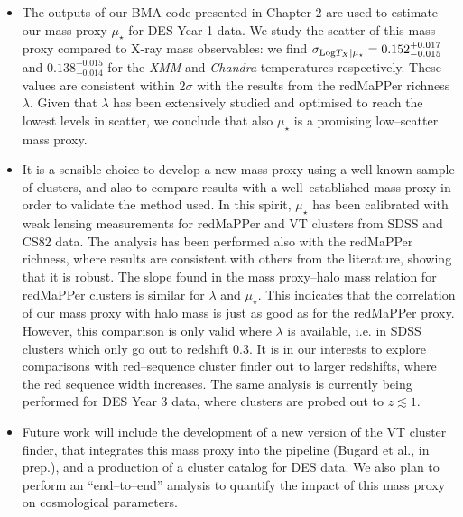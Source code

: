 \begin{itemize}
\item The outputs of our BMA code presented in Chapter 2 are used to estimate our mass proxy $\mu_\star$ for DES Year 1 data. We study the scatter of this mass proxy compared to X-ray mass observables: we find $\sigma_{{\rm Log}T_X|\mu_\star}=0.152^{+0.017}_{-0.015}$ and $0.138^{+0.015}_{-0.014}$ for the \emph{XMM} and \emph{Chandra} temperatures respectively. These values are consistent within $2\sigma$ with the results from the redMaPPer richness $\lambda$. Given that $\lambda$ has been extensively studied and optimised to reach the lowest levels in scatter, we conclude that also $\mu_\star$ is a promising low--scatter mass proxy.


\item It is a sensible choice to develop a new mass proxy using a well known sample of clusters, and also to compare results with a well--established mass proxy in order to validate the method used. In this spirit, $\mu_\star$ has been calibrated with weak lensing measurements for redMaPPer and VT clusters from SDSS and CS82 data. The analysis has been performed also with the redMaPPer richness, where results are consistent with others from the literature, showing that it is robust. The slope found in the mass proxy--halo mass relation for redMaPPer clusters is similar for $\lambda$ and $\mu_\star$. This indicates that the correlation of our mass proxy with halo mass is just as good as for the redMaPPer proxy. However, this comparison is only valid where $\lambda$ is available, i.e. in SDSS clusters which only go out to redshift 0.3. It is in our interests to explore comparisons with red--sequence cluster finder out to larger redshifts, where the red sequence width increases. The same analysis is currently being performed for DES Year 3 data, where clusters are probed out to $z\lesssim1$.

\item Future work will include the development of a new version of the VT cluster finder, that integrates this mass proxy into the pipeline (Bugard et al., in prep.), and a production of a cluster catalog for DES data. We also plan to perform an ``end--to--end'' analysis to quantify the impact of this mass proxy on cosmological parameters.  

\end{itemize}



